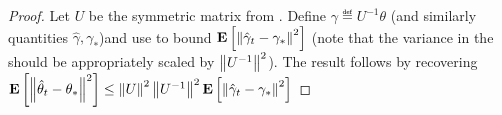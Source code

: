 \begin{comment}
\begin{align}
\E[\norm{\zh_t}^2]
&\leq \left(1+\frac2{\alpha\rhod{P_U}}\right)\, \frac1{\alpha\rhos{P_U}}\, \,
\left(\frac{\norm{z_0}^2}{(t+1)^2}+ \frac{\alpha^2(\norm{U^{-1}}^2\sigma_1^2)+\alpha (\norm{U^{-1}}\sigma_2^2)\norm{z_0}}{t+1} \right)\,\\
&\leq \left(1+\frac2{\alpha\rhod{P_U}}\right)\, \frac1{\alpha\rhos{P_U}}\, \,
\left(\frac{\norm{U^{-1}}^2\norm{e_0}^2}{(t+1)^2}+ \frac{\alpha^2(\norm{U^{-1}}^2\sigma_1^2)+\alpha (\norm{U^{-1}}\sigma_2^2)\norm{U^{-1}}\norm{e_0}}{t+1} \right)\,
\end{align}

\end{proof}
\end{comment}


\thrate*
\begin{proof}
Let $U$ be the symmetric matrix from \label{sec:hurpd}. Define $\gamma\eqdef U^{-1}\theta$ (and similarly quantities $\hat{\gamma},\gamma_*$)and use  to bound $\mathbf{E}\left[\left\| \hat{\gamma}_t-\gamma_*\right\|^2\right]$ (note that the variance in the  should be appropriately scaled by $\left\| U^{-1}\right\|^2$). The result follows by recovering $\mathbf{E}\left[\left\| \hat{\theta}_t-\theta_*\right\|^2\right]\leq \left\| U\right\|^2\left\| U^{-1}\right\|^2 \mathbf{E}\left[\left\| \hat{\gamma}_t-\gamma_*\right\|^2\right]$
\end{proof}
\begin{comment}
\begin{theorem}[Lower Bound]
There exists a distribution $P$ over $\R^{\dcd}\times\R^d$ satisfying \Cref{assmp:lsa}, such that $\alpha_P>0$, such that $\rhos{P}>0$ and $\rhod{P}>0,\,\forall \alpha\in (0,\alpha_P)$ and
\begin{align*}
\EE{\norm{\thh_t-\ts}^2} &\geq \frac{1}{(t+1)^2}(\alpha)^{-2}(\rhod{P}\rhos{P})^{-1}\Big( \big(1-(1-\alpha \rhos{P})^t\big) \norm{\theta_0-\ts}^2 \\&+ \sum_{s=1}^t \big(1-(1-\alpha \rhos{P})^{(t-s)}\big) \big(\alpha^2(\sigma_A^2\norm{\ts}^2+\sigma_b^2)+\alpha (\sigma_A^2\norm{\ts})\norm{\theta_0-\ts}\big) \Big)
\end{align*}
\end{theorem}
\end{comment}
\thlb*
